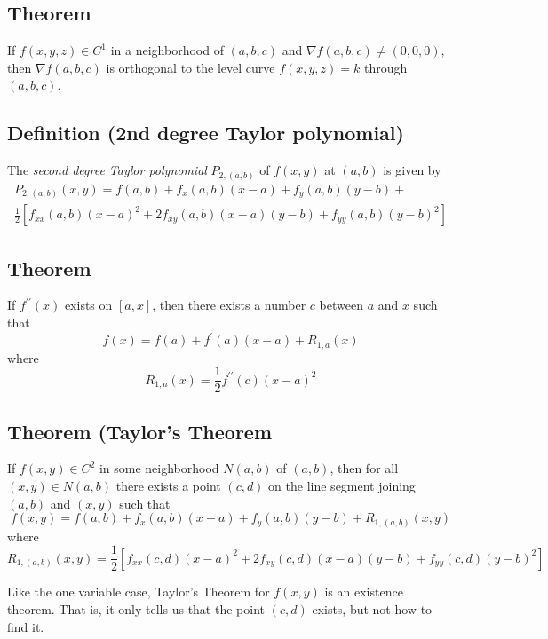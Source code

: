 \begin{thmbox}
\subsection{Theorem}
If $ f(x,y,z)\in C^1 $ in a neighborhood of $ (a,b,c) $ and
$ \nabla f(a,b,c)\neq (0,0,0) $, then $ \nabla f(a,b,c) $ is
orthogonal to the level curve $ f(x,y,z)=k $ through
$ (a,b,c) $.
\end{thmbox}

\begin{defbox}
\subsection{Definition (2nd degree Taylor polynomial)}
The \emph{second degree Taylor polynomial} $ P_{2,(a,b)} $ 
of $ f(x,y) $ at $ (a,b) $ is given by
\[
\begin{aligned}
P_{2,(a,b)}(x,y)=
f(a,b)+f_x(a,b)(x-a)+f_y(a,b)(y-b)+\\
\frac{1}{2} [f_{xx}(a,b)(x-a)^2+2f_{xy}(a,b)(x-a)(y-b)+
f_{yy}(a,b)(y-b)^2]
\end{aligned}
\]
\end{defbox}

\begin{thmbox}
\subsection{Theorem}
If $ f^{\prime\prime}(x) $ exists on $ [a,x] $, then there exists
a number $ c $ between $ a $ and $ x $ such that
\[ f(x)=f(a)+f^\prime (a)(x-a)+R_{1,a}(x) \]
where
\[ R_{1,a}(x)=\frac{1}{2} f^{\prime\prime}(c)(x-a)^2 \]
\end{thmbox}

\begin{thmbox}
\subsection{Theorem (Taylor's Theorem}
If $ f(x,y)\in C^2 $ in some neighborhood $ N(a,b) $ of
$ (a,b) $, then for all $ (x,y)\in N(a,b) $ there
exists a point $ (c,d) $ on the line segment joining
$ (a,b) $ and $ (x,y) $ such that
\[ f(x,y)=f(a,b)+f_x(a,b)(x-a)+f_y(a,b)(y-b)+R_{1,(a,b)}(x,y) \]
where
\[ R_{1,(a,b)}(x,y)=\frac{1}{2}
[f_{xx}(c,d)(x-a)^2+2f_{xy}(c,d)(x-a)(y-b)+f_{yy}(c,d)(y-b)^2] \]
\end{thmbox}

\begin{remark}
    Like the one variable case, Taylor's Theorem for $ f(x,y) $ is an
    existence theorem. That is, it only tells us that the point $ (c,d) $
    exists, but not how to find it.
\end{remark}

